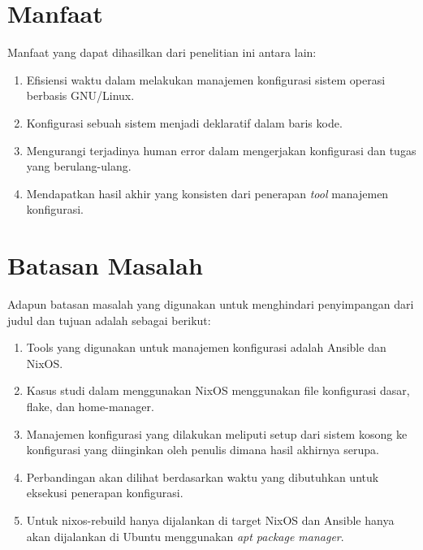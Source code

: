 \documentclass[10pt,]{report}
\begin{document}
\section{Manfaat}
\vspace{-3mm}
\begin{adjustwidth}{0.70cm}{}
	Manfaat yang dapat dihasilkan dari penelitian ini antara lain:
	\begin{enumerate}[leftmargin=0.45cm]
		\item Efisiensi waktu dalam melakukan manajemen konfigurasi sistem operasi berbasis GNU/Linux.
		\item Konfigurasi sebuah sistem menjadi deklaratif dalam baris kode.
		\item Mengurangi terjadinya human error dalam mengerjakan konfigurasi dan tugas yang berulang-ulang.
		\item Mendapatkan hasil akhir yang konsisten dari penerapan \textit{tool} manajemen konfigurasi.
	\end{enumerate}
\end{adjustwidth}
\vspace{3mm}
\section{Batasan Masalah}
\vspace{-3mm}
\begin{adjustwidth}{0.70cm}{}
	Adapun batasan masalah yang digunakan untuk menghindari penyimpangan dari judul dan tujuan adalah sebagai berikut:
	\begin{enumerate}[leftmargin=0.45cm]
		\item Tools yang digunakan untuk manajemen konfigurasi adalah Ansible dan
		      NixOS.
		\item Kasus studi dalam menggunakan NixOS menggunakan file konfigurasi
		      dasar, flake, dan home-manager.
		\item Manajemen konfigurasi yang dilakukan meliputi setup dari sistem
		      kosong ke konfigurasi yang diinginkan oleh penulis dimana hasil akhirnya
		      serupa.
		\item Perbandingan akan dilihat berdasarkan waktu yang dibutuhkan untuk
		      eksekusi penerapan konfigurasi.
		\item Untuk nixos-rebuild hanya dijalankan di target NixOS dan Ansible hanya
		      akan dijalankan di Ubuntu menggunakan \textit{apt package manager}.
	\end{enumerate}
\end{adjustwidth}
\end{document}
